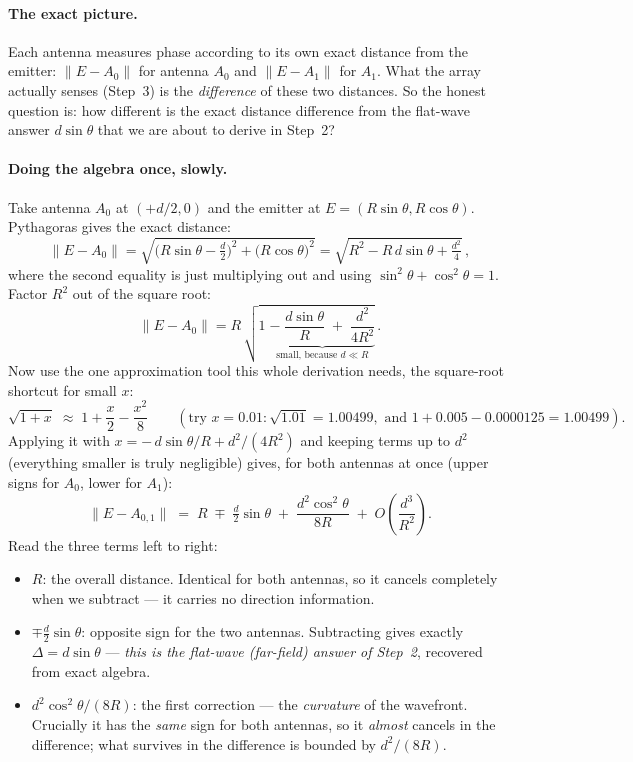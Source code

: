 \paragraph{The exact picture.}
Each antenna measures phase according to its own exact distance from the
emitter: $\lVert E - A_0\rVert$ for antenna $A_0$ and $\lVert E - A_1\rVert$
for $A_1$. What the array actually senses (Step~3) is the \emph{difference}
of these two distances. So the honest question is: how different is the exact
distance difference from the flat-wave answer $d\sin\theta$ that we are about
to derive in Step~2?

\paragraph{Doing the algebra once, slowly.}
Take antenna $A_0$ at $(+d/2, 0)$ and the emitter at
$E = (R\sin\theta, R\cos\theta)$. Pythagoras gives the exact distance:
\[
\lVert E - A_0\rVert
 = \sqrt{\big(R\sin\theta - \tfrac{d}{2}\big)^2 + \big(R\cos\theta\big)^2}
 = \sqrt{R^2 - R\,d\sin\theta + \tfrac{d^2}{4}}\,,
\]
where the second equality is just multiplying out and using
$\sin^2\theta + \cos^2\theta = 1$. Factor $R^2$ out of the square root:
\[
\lVert E - A_0\rVert
 = R\,\sqrt{1 \;\underbrace{-\; \frac{d\sin\theta}{R}
   \;+\; \frac{d^2}{4R^2}}_{\text{small, because } d \ll R}}\,.
\]
Now use the one approximation tool this whole derivation needs, the
square-root shortcut for small $x$:
\[
\sqrt{1 + x} \;\approx\; 1 + \frac{x}{2} - \frac{x^2}{8}
\qquad (\text{try } x = 0.01: \sqrt{1.01} = 1.00499, \text{ and }
1 + 0.005 - 0.0000125 = 1.00499).
\]
Applying it with $x = -\,d\sin\theta/R + d^2/(4R^2)$ and keeping terms up to
$d^2$ (everything smaller is truly negligible) gives, for both antennas at
once (upper signs for $A_0$, lower for $A_1$):
\[
\lVert E - A_{0,1}\rVert
  \;=\; R \;\mp\; \tfrac{d}{2}\sin\theta
    \;+\; \frac{d^2\cos^2\theta}{8R} \;+\; O\!\left(\frac{d^3}{R^2}\right).
\]
Read the three terms left to right:
\begin{itemize}
  \item $R$: the overall distance. Identical for both antennas, so it cancels
        completely when we subtract --- it carries no direction information.
  \item $\mp \tfrac{d}{2}\sin\theta$: opposite sign for the two antennas.
        Subtracting gives exactly $\Delta = d\sin\theta$ --- \emph{this is the
        flat-wave (far-field) answer of Step~2}, recovered from exact algebra.
  \item $d^2\cos^2\theta/(8R)$: the first correction --- the \emph{curvature}
        of the wavefront. Crucially it has the \emph{same} sign for both
        antennas, so it \emph{almost} cancels in the difference; what survives
        in the difference is bounded by $d^2/(8R)$.
\end{itemize}

